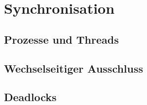 \chapter{Synchronisation}

\section{Prozesse und Threads}

\section{Wechselseitiger Ausschluss}

\section{Deadlocks}
